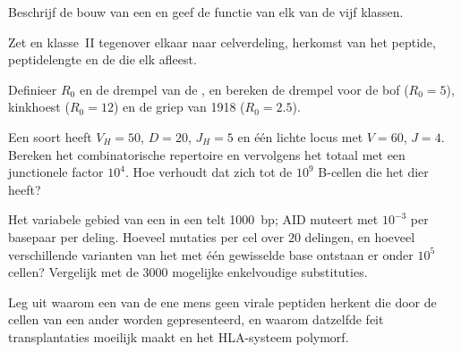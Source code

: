 \begin{exercise}[$\star$]\label{exo:b3:adaptive-immunity:2}
Beschrijf de bouw van een  en geef de functie van elk van de
vijf klassen.
\end{exercise}

\begin{exercise}[$\star$]\label{exo:b3:adaptive-immunity:3}
Zet  en klasse~II tegenover elkaar naar celverdeling,
herkomst van het peptide, peptidelengte en de  die elk afleest.
\end{exercise}

\begin{exercise}[$\star$]\label{exo:b3:adaptive-immunity:4}
Definieer $R_{0}$ en de drempel van de , en bereken de
drempel voor de bof ($R_{0} = 5$), kinkhoest ($R_{0} = 12$) en de griep
van 1918 ($R_{0} = 2.5$).
\end{exercise}

\begin{exercise}[$\star\star$]\label{exo:b3:adaptive-immunity:5}
Een soort heeft $V_{H} = 50$, $D = 20$, $J_{H} = 5$ en één lichte locus
met $V = 60$, $J = 4$. Bereken het combinatorische repertoire en
vervolgens het totaal met een junctionele factor $10^{4}$. Hoe
verhoudt dat zich tot de $10^{9}$ B-cellen die het dier heeft?
\end{exercise}

\begin{exercise}[$\star\star$]\label{exo:b3:adaptive-immunity:6}
Het variabele gebied van een  in een  telt
\qty{1000}{bp}; AID muteert met $10^{-3}$ per basepaar per deling.
Hoeveel mutaties per cel over $20$ delingen, en hoeveel verschillende
varianten van het  met één gewisselde base ontstaan er onder
$10^{5}$ cellen? Vergelijk met de $3000$ mogelijke enkelvoudige
substituties.
\end{exercise}

\begin{exercise}[$\star\star$]\label{exo:b3:adaptive-immunity:7}
Leg uit waarom een  van de ene mens geen virale peptiden herkent
die door de cellen van een ander worden gepresenteerd, en waarom
datzelfde feit transplantaties moeilijk maakt en het HLA-systeem
polymorf.
\end{exercise}

